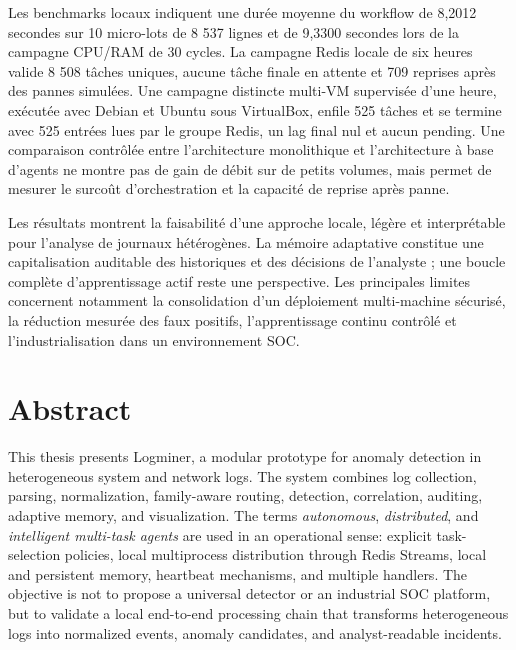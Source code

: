 \documentclass[12pt,a4paper,oneside]{report}
\newcommand{\logminer}{Logminer}
\begin{document}
Les benchmarks locaux indiquent une durée moyenne du workflow de 8,2012 secondes sur 10 micro-lots de 8 537 lignes et de 9,3300 secondes lors de la campagne CPU/RAM de 30 cycles. La campagne Redis locale de six heures valide 8 508 tâches uniques, aucune tâche finale en attente et 709 reprises après des pannes simulées. Une campagne distincte multi-VM supervisée d'une heure, exécutée avec Debian et Ubuntu sous VirtualBox, enfile 525 tâches et se termine avec 525 entrées lues par le groupe Redis, un lag final nul et aucun pending. Une comparaison contrôlée entre l'architecture monolithique et l'architecture à base d'agents ne montre pas de gain de débit sur de petits volumes, mais permet de mesurer le surcoût d'orchestration et la capacité de reprise après panne.

Les résultats montrent la faisabilité d'une approche locale, légère et interprétable pour l'analyse de journaux hétérogènes. La mémoire adaptative constitue une capitalisation auditable des historiques et des décisions de l'analyste ; une boucle complète d'apprentissage actif reste une perspective. Les principales limites concernent notamment la consolidation d'un déploiement multi-machine sécurisé, la réduction mesurée des faux positifs, l'apprentissage continu contrôlé et l'industrialisation dans un environnement SOC.

\chapter*{Abstract}

This thesis presents \logminer{}, a modular prototype for anomaly detection in heterogeneous system and network logs. The system combines log collection, parsing, normalization, family-aware routing, detection, correlation, auditing, adaptive memory, and visualization. The terms \textit{autonomous}, \textit{distributed}, and \textit{intelligent multi-task agents} are used in an operational sense: explicit task-selection policies, local multiprocess distribution through Redis Streams, local and persistent memory, heartbeat mechanisms, and multiple handlers. The objective is not to propose a universal detector or an industrial SOC platform, but to validate a local end-to-end processing chain that transforms heterogeneous logs into normalized events, anomaly candidates, and analyst-readable incidents.
\end{document}
